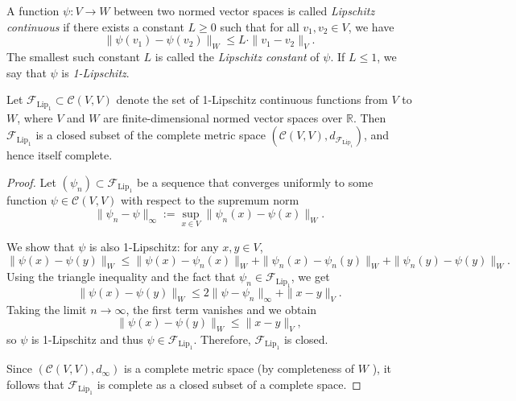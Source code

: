 \begin{definition}
	A function \( \psi \colon V \to W \) between two normed vector spaces is called \emph{Lipschitz continuous} \cite{forster_analysis_2025} if there exists a constant \( L \geq 0 \) such that for all \( v_1, v_2 \in V \), we have
	\[
	\| \psi(v_1) - \psi(v_2) \|_W \leq L \cdot \| v_1 - v_2 \|_V.
	\]
	The smallest such constant \( L \) is called the \emph{Lipschitz constant} of \( \psi \). If \( L \leq 1 \), we say that \( \psi \) is \emph{1-Lipschitz}.
\end{definition}


\begin{proposition}\label{prop:complete_F_Lip}
Let \(  \mathcal{F}_{\mathrm{Lip}_1} \subset \mathcal{C}(V, V) \) denote the set of 1-Lipschitz continuous functions from \( V \) to \( W \), where \( V \) and \( W \) are finite-dimensional normed vector spaces over \( \mathbb{R} \).
Then \( \mathcal{F}_{\text{Lip}_1} \) is a closed subset of the complete metric space \( (\mathcal{C}(V, V),d_{\mathcal{F}_{\text{Lip}_1}}) \), and hence itself complete.
\end{proposition}

\begin{proof}
Let \( (\psi_n) \subset \mathcal{F}_{\text{Lip}_1} \) be a sequence that converges uniformly to some function \( \psi \in \mathcal{C}(V, V) \) with respect to the supremum norm
\[
\|\psi_n - \psi\|_\infty := \sup_{x \in V} \|\psi_n(x) - \psi(x)\|_W.
\]

We show that \( \psi \) is also 1-Lipschitz:
for any \( x, y \in V \),
\[
\|\psi(x) - \psi(y)\|_W \leq \|\psi(x) - \psi_n(x)\|_W + \|\psi_n(x) - \psi_n(y)\|_W + \|\psi_n(y) - \psi(y)\|_W.
\]
Using the triangle inequality and the fact that \( \psi_n \in \mathcal{F}_{\text{Lip}_1} \), we get
\[
\|\psi(x) - \psi(y)\|_W \leq 2\|\psi - \psi_n\|_\infty + \|x - y\|_V.
\]
Taking the limit \( n \to \infty \), the first term vanishes and we obtain
\[
\|\psi(x) - \psi(y)\|_W \leq \|x - y\|_V,
\]
so \( \psi \) is 1-Lipschitz and thus \( \psi \in \mathcal{F}_{\text{Lip}_1} \). Therefore, \( \mathcal{F}_{\text{Lip}_1} \) is closed.

Since \( (\mathcal{C}(V, V), d_\infty) \) is a complete metric space (by completeness of \( W \) \cite{werner_funktionalanalysis_2005}), it follows that \( \mathcal{F}_{\text{Lip}_1} \) is complete as a closed subset of a complete space.
\end{proof}



